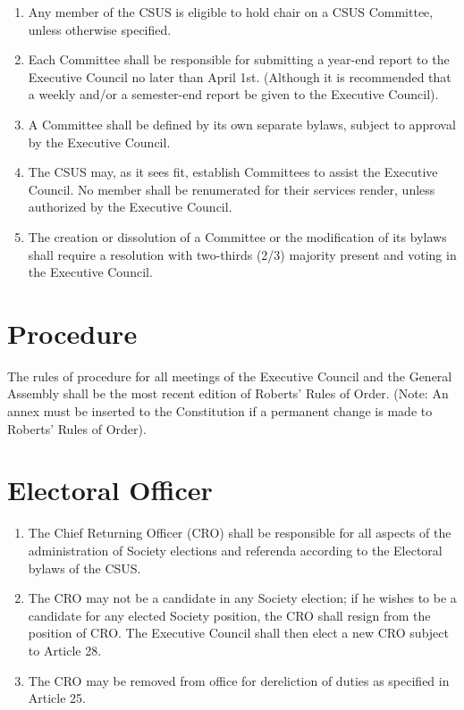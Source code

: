 \begin{enumerate}
\def\labelenumi{\arabic{enumi}.}
\item
  Any member of the CSUS is eligible to hold chair on a CSUS Committee,
  unless otherwise specified.
\item
  Each Committee shall be responsible for submitting a year-end report
  to the Executive Council no later than April 1st. (Although it is
  recommended that a weekly and/or a semester-end report be given to the
  Executive Council).
\item
  A Committee shall be defined by its own separate bylaws, subject to
  approval by the Executive Council.
\item
  The CSUS may, as it sees fit, establish Committees to assist the
  Executive Council. No member shall be renumerated for their services
  render, unless authorized by the Executive Council.
\item
  The creation or dissolution of a Committee or the modification of its
  bylaws shall require a resolution with two-thirds (2/3) majority
  present and voting in the Executive Council.
\end{enumerate}

\section{Procedure}\label{procedure}

The rules of procedure for all meetings of the Executive Council and the
General Assembly shall be the most recent edition of Roberts' Rules of
Order. (Note: An annex must be inserted to the Constitution if a
permanent change is made to Roberts' Rules of Order).

\section{Electoral Officer}\label{electoral-officer}

\begin{enumerate}
\def\labelenumi{\arabic{enumi}.}
\item
  The Chief Returning Officer (CRO) shall be responsible for all aspects
  of the administration of Society elections and referenda according to
  the Electoral bylaws of the CSUS.
\item
  The CRO may not be a candidate in any Society election; if he wishes
  to be a candidate for any elected Society position, the CRO shall
  resign from the position of CRO. The Executive Council shall then
  elect a new CRO subject to Article 28.
\item
  The CRO may be removed from office for dereliction of duties as
  specified in Article 25.
\end{enumerate}

